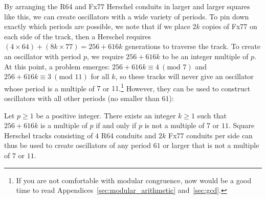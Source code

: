 
By arranging the R64 and Fx77 Herschel conduits in larger and larger squares like this, we can create oscillators with a wide variety of periods. To pin down exactly which periods are possible, we note that if we place $2k$ copies of Fx77 on each side of the track, then a Herschel requires $(4 \times 64) + (8k \times 77) = 256 + 616k$ generations to traverse the track. To create an oscillator with period $p$, we require $256 + 616k$ to be an integer multiple of $p$. At this point, a problem emerges: $256 + 616k \equiv 4 \ (\text{mod } 7)$ and $256 + 616k \equiv 3 \ (\text{mod } 11)$ for all $k$, so these tracks will never give an oscillator whose period is a multiple of $7$ or $11$.\footnote{If you are not comfortable with modular congruence, now would be a good time to read Appendices~\ref{sec:modular_arithmetic} and~\ref{sec:gcd}.} However, they can be used to construct oscillators with all other periods (no smaller than $61$):

\begin{theorem}\label{thm:Herschel_7_11}
	Let $p \geq 1$ be a positive integer. There exists an integer $k \geq 1$ such that $256 + 616k$ is a multiple of $p$ if and only if $p$ is not a multiple of $7$ or $11$. Square Herschel tracks consisting of $4$ R64 conduits and $2k$ Fx77 conduits per side can thus be used to create oscillators of any period $61$ or larger that is not a multiple of $7$ or $11$.
\end{theorem}

